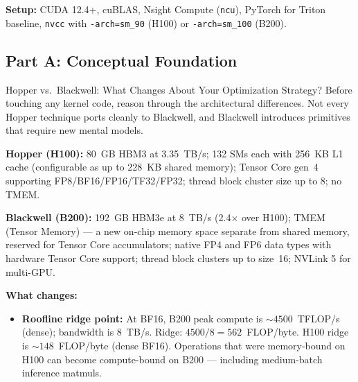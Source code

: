 \textbf{Setup:} CUDA 12.4+, cuBLAS, Nsight Compute (\texttt{ncu}), PyTorch for Triton baseline, \texttt{nvcc} with \texttt{-arch=sm\_90} (H100) or \texttt{-arch=sm\_100} (B200).

\subsection{Part A: Conceptual Foundation}

\begin{thinkfirst}{Hopper vs.\ Blackwell: What Changes About Your Optimization Strategy?}
Before touching any kernel code, reason through the architectural differences. Not every Hopper technique ports cleanly to Blackwell, and Blackwell introduces primitives that require new mental models.

\textbf{Hopper (H100):} 80~GB HBM3 at 3.35~TB/s; 132 SMs each with 256~KB L1 cache (configurable as up to 228~KB shared memory); Tensor Core gen~4 supporting FP8/BF16/FP16/TF32/FP32; thread block cluster size up to 8; no TMEM.

\textbf{Blackwell (B200):} 192~GB HBM3e at 8~TB/s (2.4$\times$ over H100); TMEM (Tensor Memory) --- a new on-chip memory space separate from shared memory, reserved for Tensor Core accumulators; native FP4 and FP6 data types with hardware Tensor Core support; thread block clusters up to size~16; NVLink 5 for multi-GPU.

\textbf{What changes:}
\begin{itemize}
  \item \textbf{Roofline ridge point:} At BF16, B200 peak compute is $\sim 4500$~TFLOP/s (dense); bandwidth is $8$~TB/s. Ridge: $4500/8 = 562$~FLOP/byte. H100 ridge is $\sim 148$~FLOP/byte (dense BF16). Operations that were memory-bound on H100 can become compute-bound on B200 --- including medium-batch inference matmuls.

\begin{center}
\end{center}
\end{itemize}
\end{thinkfirst}
